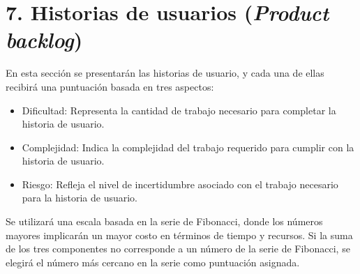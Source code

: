 \documentclass[
11pt, %
codirector, %
]{charter}
\begin{document}
\section{7. Historias de usuarios (\textit{Product backlog})}
\label{sec:backlog}

En esta sección se presentarán las historias de usuario, y cada una de ellas recibirá una puntuación basada en tres aspectos:
\begin{itemize}
 \item Dificultad: Representa la cantidad de trabajo necesario para completar la historia de usuario.
 \item Complejidad: Indica la complejidad del trabajo requerido para cumplir con la historia de usuario.
 \item Riesgo: Refleja el nivel de incertidumbre asociado con el trabajo necesario para la historia de usuario.
\end{itemize}
Se utilizará una escala basada en la serie de Fibonacci, donde los números mayores implicarán un mayor costo en términos de tiempo y recursos. Si la suma de los tres componentes no corresponde a un número de la serie de Fibonacci, se elegirá el número más cercano en la serie como puntuación asignada.
\end{document}
